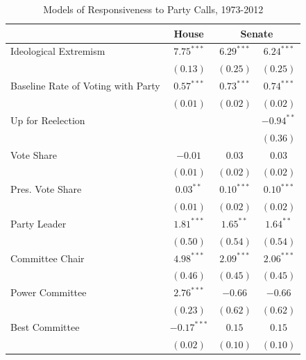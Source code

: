 \documentclass[12pt]{article}
\begin{document}
\begin{table}[!htbp]
\centering
\begin{threeparttable}
\caption{Models of Responsiveness to Party Calls, 1973-2012}
\label{tab-responsiveness-regressions}
\singlespacing
\begin{tabular}{l c c c }
\hline
& House & \multicolumn{2}{c}{Senate} \\
\hline
Ideological Extremism             & $7.75^{***}$  & $6.29^{***}$  & $6.24^{***}$  \\
                                  & $(0.13)$      & $(0.25)$      & $(0.25)$      \\
Baseline Rate of Voting with Party& $0.57^{***}$  & $0.73^{***}$  & $0.74^{***}$  \\
                                  & $(0.01)$      & $(0.02)$      & $(0.02)$      \\
Up for Reelection                 &               &               & $-0.94^{**}$  \\
                                  &               &               & $(0.36)$      \\
Vote Share                        & $-0.01$       & $0.03$        & $0.03$        \\
                                  & $(0.01)$      & $(0.02)$      & $(0.02)$      \\
Pres. Vote Share                  & $0.03^{**}$   & $0.10^{***}$  & $0.10^{***}$  \\
                                  & $(0.01)$      & $(0.02)$      & $(0.02)$      \\
Party Leader                      & $1.81^{***}$  & $1.65^{**}$   & $1.64^{**}$   \\
                                  & $(0.50)$      & $(0.54)$      & $(0.54)$      \\
Committee Chair                   & $4.98^{***}$  & $2.09^{***}$  & $2.06^{***}$  \\
                                  & $(0.46)$      & $(0.45)$      & $(0.45)$      \\
Power Committee                   & $2.76^{***}$  & $-0.66$       & $-0.66$       \\
                                  & $(0.23)$      & $(0.62)$      & $(0.62)$      \\
Best Committee                    & $-0.17^{***}$ & $0.15$        & $0.15$        \\
                                  & $(0.02)$      & $(0.10)$      & $(0.10)$      \\

\end{tabular}
\end{threeparttable}
\end{table}
\end{document}
